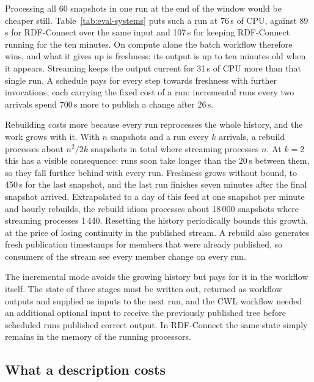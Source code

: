 Processing all 60 snapshots in one run at the end of the window would be
cheaper still. Table~\ref{tab:eval-systems} puts such a run at 76\,s of CPU,
against 89\,s for RDF-Connect over the same input and 107\,s for keeping
RDF-Connect running for the ten minutes. On compute alone the batch workflow
therefore wins, and what it gives up is freshness: its output is up to ten
minutes old when it appears. Streaming keeps the output current for 31\,s of
CPU more than that single run. A schedule pays for every step towards freshness
with further invocations, each carrying the fixed cost of a run: incremental
runs every two arrivals spend 700\,s more to publish a change after 26\,s.

Rebuilding costs more because every run reprocesses the whole history, and the
work grows with it. With $n$ snapshots and a run every $k$ arrivals, a rebuild
processes about $n^2/2k$ snapshots in total where streaming processes $n$. At
$k=2$ this has a visible consequence: runs soon take longer than the 20\,s
between them, so they fall further behind with every run. Freshness grows
without bound, to 450\,s for the last snapshot, and the last run finishes seven
minutes after the final snapshot arrived. Extrapolated to a day of this feed at
one snapshot per minute and hourly rebuilds, the rebuild idiom processes about
18\,000 snapshots where streaming processes 1\,440. Resetting the history
periodically bounds this growth, at the price of losing continuity in the
published stream. A rebuild also generates fresh publication timestamps for
members that were already published, so consumers of the stream see every
member change on every run.

The incremental mode avoids the growing history but pays for it in the workflow
itself. The state of three stages must be written out, returned as workflow
outputs and supplied as inputs to the next run, and the CWL workflow needed an
additional optional input to receive the previously published tree before
scheduled runs published correct output. In RDF-Connect the same state simply
remains in the memory of the running processors.

\subsection{What a description costs}
\label{sec:eval-config}

